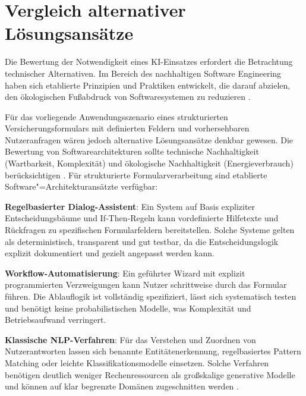\section{Vergleich alternativer Lösungsansätze}

Die Bewertung der Notwendigkeit eines KI-Einsatzes erfordert die Betrachtung technischer Alternativen. Im Bereich des nachhaltigen Software Engineering haben sich etablierte Prinzipien und Praktiken entwickelt, die darauf abzielen, den ökologischen Fußabdruck von Softwaresystemen zu reduzieren \cite{akohatadogaToolsTechniquesTrends2024}.

Für das vorliegende Anwendungsszenario eines strukturierten Versicherungsformulars mit definierten Feldern und vorhersehbaren Nutzeranfragen wären jedoch alternative Lösungsansätze denkbar gewesen. Die Bewertung von Softwarearchitekturen sollte technische Nachhaltigkeit (Wartbarkeit, Komplexität) und ökologische Nachhaltigkeit (Energieverbrauch) berücksichtigen \cite{ventersSustainableSoftwareEngineering2023}. Für strukturierte Formularverarbeitung sind etablierte Software"=Architekturansätzte verfügbar:

\begin{description}[noitemsep,topsep=5pt]
    \item \textbf{Regelbasierter Dialog-Assistent}: Ein System auf Basis expliziter Entscheidungsbäume und If‑Then‑Regeln kann vordefinierte Hilfetexte und Rückfragen zu spezifischen Formularfeldern bereitstellen. Solche Systeme gelten als deterministisch, transparent und gut testbar, da die Entscheidungslogik explizit dokumentiert und gezielt angepasst werden kann. 
    \item \textbf{Workflow-Automatisierung}: Ein geführter Wizard mit explizit programmierten Verzweigungen kann Nutzer schrittweise durch das Formular führen. Die Ablauflogik ist vollständig spezifiziert, lässt sich systematisch testen und benötigt keine probabilistischen Modelle, was Komplexität und Betriebsaufwand verringert.
    \item \textbf{Klassische NLP-Verfahren}: Für das Verstehen und Zuordnen von Nutzerantworten lassen sich benannte Entitätenerkennung, regelbasiertes Pattern Matching oder leichte Klassifikationsmodelle einsetzen. Solche Verfahren benötigen deutlich weniger Rechenressourcen als großskalige generative Modelle und können auf klar begrenzte Domänen zugeschnitten werden \cite[]{strubellEnergyPolicyConsiderations2019,zschacheComparingEnergyConsumption2025}.
\end{description}

